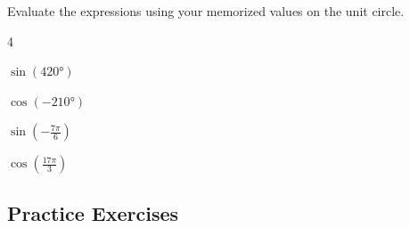 \begin{myPrep}
	Evaluate the expressions using your memorized values on the unit circle.
		\begin{enumerate}
		\end{enumerate}
\end{myPrep}
\vfill


\newpage

\subsection*{Practice Exercises} \label{practice-exercises-section-polar-coordinates}


